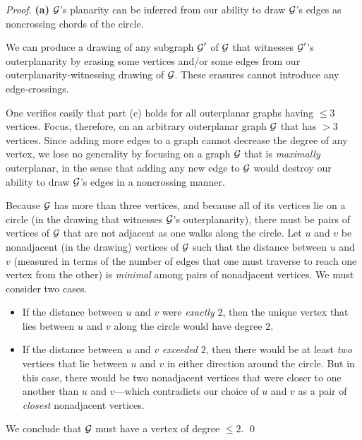 \begin{proof}
{\bf (a)}
$\mbox{$\cal G$}$'s planarity can be inferred from our ability to draw $\mbox{$\cal G$}$'s edges as noncrossing chords of the circle.

\medskip

We can produce a drawing of any subgraph  $\mbox{$\cal G$}'$ of $\mbox{$\cal G$}$ that witnesses $\mbox{$\cal G$}'$'s outerplanarity by erasing some vertices and/or some edges from our outerplanarity-witnessing drawing of $\mbox{$\cal G$}$.  These erasures cannot introduce any edge-crossings.

\medskip

One verifies easily that part (c) holds for all outerplanar graphs having $\leq 3$ vertices.  Focus, therefore, on an arbitrary outerplanar graph $\mbox{$\cal G$}$ that has $> 3$ vertices.  Since adding more edges to a graph cannot decrease the degree of any vertex, we lose no generality by focusing on a graph $\mbox{$\cal G$}$ that is {\em maximally} outerplanar, in the sense that adding any new edge to $\mbox{$\cal G$}$ would destroy our ability to draw $\mbox{$\cal G$}$'s edges in a noncrossing manner.

\smallskip

Because $\mbox{$\cal G$}$ has more than three vertices, and because all of its vertices lie on a circle (in the drawing that witnesses $\mbox{$\cal G$}$'s outerplanarity), there must be pairs of vertices of $\mbox{$\cal G$}$ that are not adjacent as one walks along the circle.  Let $u$ and $v$ be nonadjacent (in the drawing) vertices of $\mbox{$\cal G$}$ such 
that the distance between $u$ and $v$ (measured in terms of the number of edges that one must traverse to reach one vertex from the other) is {\em minimal} among pairs of nonadjacent vertices.  We must consider two cases.
\begin{itemize}
\item
If the distance between $u$ and $v$ were {\em exactly} $2$, then the unique vertex that lies between $u$ and $v$ along the circle would have degree $2$.
\medskip\item
If the distance between $u$ and $v$ {\em exceeded} $2$, then there would be at least {\em two} vertices that lie between $u$ and $v$ in either direction around the circle.  But in this case, there would be two nonadjacent vertices that were closer to one another than $u$ and $v$---which contradicts our choice of $u$ and $v$ as a pair of {\em closest} nonadjacent vertices.
\end{itemize}
We conclude that $\mbox{$\cal G$}$ must have a vertex of degree $\leq 2$.  \qed
\end{proof}


